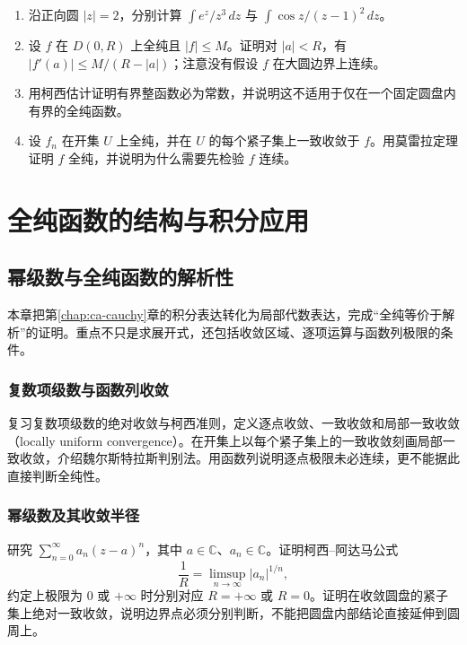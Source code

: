 \documentclass[UTF8,12pt,a4paper,fontset=fandol]{ctexbook}
\begin{document}
\begin{enumerate}
  \item\label{ex:ca-cauchy-integrals} 沿正向圆 $|z|=2$，分别计算 $\int e^z/z^3\,dz$ 与 $\int\cos z/(z-1)^2\,dz$。
  \item\label{ex:ca-derivative-bound} 设 $f$ 在 $D(0,R)$ 上全纯且 $|f|\le M$。证明对 $|a|<R$，有 $|f'(a)|\le M/(R-|a|)$；注意没有假设 $f$ 在大圆边界上连续。
  \item\label{ex:ca-entire-bounded} 用柯西估计证明有界整函数必为常数，并说明这不适用于仅在一个固定圆盘内有界的全纯函数。
  \item\label{ex:ca-uniform-holomorphic} 设 $f_n$ 在开集 $U$ 上全纯，并在 $U$ 的每个紧子集上一致收敛于 $f$。用莫雷拉定理证明 $f$ 全纯，并说明为什么需要先检验 $f$ 连续。
\end{enumerate}


\part{全纯函数的结构与积分应用}

\chapter{幂级数与全纯函数的解析性}
\label{chap:ca-series}

本章把第\ref{chap:ca-cauchy}章的积分表达转化为局部代数表达，完成“全纯等价于解析”的证明。重点不只是求展开式，还包括收敛区域、逐项运算与函数列极限的条件。

\section{复数项级数与函数列收敛}
复习复数项级数的绝对收敛与柯西准则，定义逐点收敛、一致收敛和局部一致收敛（locally uniform convergence）。在开集上以每个紧子集上的一致收敛刻画局部一致收敛，介绍魏尔斯特拉斯判别法。用函数列说明逐点极限未必连续，更不能据此直接判断全纯性。

\section{幂级数及其收敛半径}
研究 $\sum_{n=0}^{\infty}a_n(z-a)^n$，其中 $a\in\mathbb{C}$、$a_n\in\mathbb{C}$。证明柯西--阿达马公式
\begin{equation}
  \frac{1}{R}=\limsup_{n\to\infty}|a_n|^{1/n},
  \label{eq:ca-radius}
\end{equation}
约定上极限为 $0$ 或 $+\infty$ 时分别对应 $R=+\infty$ 或 $R=0$。证明在收敛圆盘的紧子集上绝对一致收敛，说明边界点必须分别判断，不能把圆盘内部结论直接延伸到圆周上。
\end{document}
